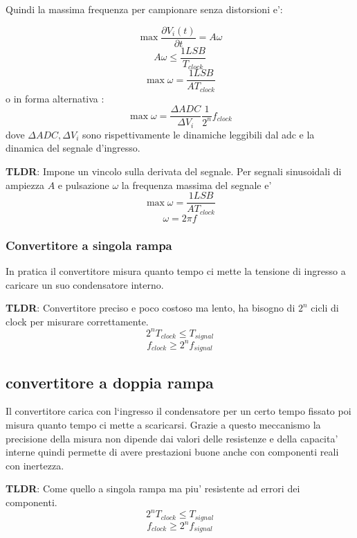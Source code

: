 \documentclass[\main/main.tex]{subfiles}
\begin{document}
Quindi  la massima frequenza per campionare senza distorsioni e':

\[\max{\frac{\partial V_i(t)}{\partial t}} = A \omega \]
\[A\omega \le \frac{1LSB}{T_{clock}}\]
\[\max{\omega} = \frac{1LSB}{A T_{clock}}\]
o in forma alternativa :
\[\max{\omega} = \frac{\Delta ADC}{\Delta V_i} \frac{1}{2^n} f_{clock} \]
dove $\Delta ADC , \Delta V_i$ sono rispettivamente le dinamiche leggibili dal adc e la dinamica del segnale d'ingresso.

\textbf{TLDR}: Impone un vincolo sulla derivata del segnale. Per segnali sinusoidali di ampiezza $A$ e pulsazione $\omega$ la frequenza massima del segnale e'
\[\max{\omega} = \frac{1LSB}{A T_{clock}}\]
\[\omega = 2 \pi f\]

\subsubsection{Convertitore a singola rampa}
In pratica il convertitore misura quanto tempo ci mette la tensione di ingresso a caricare un suo condensatore interno.

\textbf{TLDR}: Convertitore preciso e poco costoso ma lento, ha bisogno di $2^n$ cicli di clock per misurare correttamente.
\[2^n T_{clock} \le T_{signal}\]
\[f_{clock} \ge 2^n f_{signal}\]

\subsection{convertitore a doppia rampa}
Il convertitore carica con l`ingresso il condensatore per un certo tempo fissato poi misura quanto tempo ci mette a scaricarsi.
Grazie a questo meccanismo la precisione della misura non dipende dai valori delle resistenze e della capacita' interne quindi
permette di avere prestazioni buone anche con componenti reali con inertezza.

\textbf{TLDR}: Come quello a singola rampa ma piu' resistente ad errori dei componenti.
\[2^n T_{clock} \le T_{signal}\]
\[f_{clock} \ge 2^n f_{signal}\]
\end{document}
